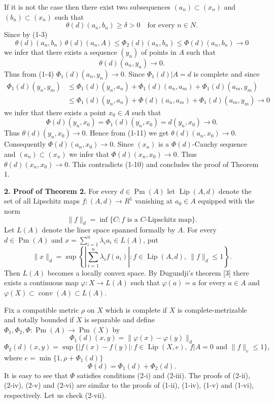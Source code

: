 \documentclass[11pt,a4paper,leqno,twoside]{article}
\newcommand{\Pm}{\operatorname{Pm}}
\newcommand{\Lip}{\operatorname{Lip}}
\newcommand{\conv}{\operatorname{conv}}
\newcommand{\norm}[1]{\lVert#1\rVert}
\newcommand{\restr}{\vert}
\begin{document}
If it is not the case then there exist two subsequences $(a_n)\subset(x_n)$ and $(b_n)\subset(x_n)$ such that
\begin{equation}\tag{1-10}
\theta(d)(a_n,b_n)\geq\delta>0\quad\text{for every }n\in N.
\end{equation}
Since by (1-3)
\[\theta(d)(a_n,b_n)\,\theta(d)(a_n,A)\leq\Phi_2(d)(a_n,b_n)\leq\Phi(d)(a_n,b_n)\to0\]
we infer that there exists a sequence $(y_n)$ of points in $A$ such that
\begin{equation}\tag{1-11}
\theta(d)(a_n,y_n)\to0.
\end{equation}
Thus from (1-4) $\Phi_1(d)(a_n,y_n)\to0$. Since $\Phi_1(d)\restr A=d$ is complete and since
\[
\begin{aligned}
\Phi_1(d)(y_n,y_m)&\leq\Phi_1(d)(y_n,a_n)+\Phi_1(d)(a_n,a_m)+\Phi_1(d)(a_m,y_m)\\
&\leq\Phi_1(d)(y_n,a_n)+\Phi(d)(a_n,a_m)+\Phi_1(d)(a_m,y_m)\to0
\end{aligned}
\]
we infer that there exists a point $x_0\in A$ such that
\[\Phi(d)(y_n,x_0)=\Phi_1(d)(y_n,x_0)=d(y_n,x_0)\to0.\]
Thus $\theta(d)(y_n,x_0)\to0$. Hence from (1-11) we get $\theta(d)(a_n,x_0)\to0$. Consequently $\Phi(d)(a_n,x_0)\to0$. Since $(x_n)$ is a $\Phi(d)$-Cauchy sequence and $(a_n)\subset(x_n)$ we infer that $\Phi(d)(x_n,x_0)\to0$. Thus $\theta(d)(x_n,x_0)\to0$. This contradicts (1-10) and concludes the proof of Theorem 1.

\par\medskip\noindent\textbf{2. Proof of Theorem 2.} For every $d\in\Pm(A)$ let $\Lip(A,d)$ denote the set of all Lipschitz maps $f:(A,d)\to R^1$ vanishing at $a_0\in A$ equipped with the norm
\[\norm f_d=\inf\{C:f\text{ is a }C\text{-Lipschitz map}\}.\]
Let $L(A)$ denote the liner space spanned formally by $A$. For every $d\in\Pm(A)$ and $x=\sum_{i=1}^n\lambda_i a_i\in L(A)$, put
\[
\norm x_d=\sup\left\{\left|\sum_{i=1}^n\lambda_i f(a_i)\right|:f\in\Lip(A,d),\ \norm f_d\leq1\right\}.
\]
Then $L(A)$ becomes a locally convex space. By Dugundji's theorem [3] there exists a continuous map $\varphi:X\to L(A)$ such that $\varphi(a)=a$ for every $a\in A$ and $\varphi(X)\subset\conv(A)\subset L(A)$.

\newpage %
Fix a compatible metric $\rho$ on $X$ which is complete if $X$ is complete-metrizable and totally bounded if $X$ is separable and define $\Phi_1,\Phi_2,\Phi:\Pm(A)\to\Pm(X)$ by
\begin{equation}\tag{2-1}
\Phi_1(d)(x,y)=\norm{\varphi(x)-\varphi(y)}_d
\end{equation}
\begin{equation}\tag{2-2}
\Phi_2(d)(x,y)=\sup\{|f(x)-f(y)|:f\in\Lip(X,e),\ f\restr A=0\text{ and }\norm f_e\leq1\},
\end{equation}
where $e=\min\{1,\rho+\Phi_1(d)\}$
\begin{equation}\tag{2-3}
\Phi(d)=\Phi_1(d)+\Phi_2(d).
\end{equation}
It is easy to see that $\Phi$ satisfies conditions (2-i) and (2-iii). The proofs of (2-ii), (2-iv), (2-v) and (2-vi) are similar to the proofs of (1-ii), (1-iv), (1-v) and (1-vi), respectively. Let us check (2-vii).
\end{document}
